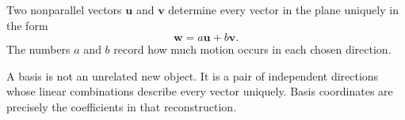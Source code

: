 \begin{theorembox}
Two nonparallel vectors $\mathbf u$ and $\mathbf v$ determine every vector in
the plane uniquely in the form
\[
\boxed{\mathbf w=a\mathbf u+b\mathbf v}.
\]
The numbers $a$ and $b$ record how much motion occurs in each chosen direction.
\end{theorembox}

\begin{interpretationbox}
A basis is not an unrelated new object. It is a pair of independent directions
whose linear combinations describe every vector uniquely. Basis coordinates are
precisely the coefficients in that reconstruction.
\end{interpretationbox}
